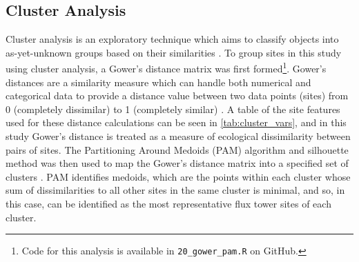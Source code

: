 \subsection{Cluster Analysis} \label{sec:cluster}
Cluster analysis is an exploratory technique which aims to classify objects into as-yet-unknown groups based on their similarities \parencite{landau2010cluster}. To group sites in this study using cluster analysis, a Gower's distance matrix was first formed\footnote{Code for this analysis is available in \texttt{20\_gower\_pam.R} on GitHub.}. Gower's distances are a similarity measure which can handle both numerical and categorical data to provide a distance value between two data points (sites) from 0 (completely dissimilar) to 1 (completely similar) \parencite{gower1971}. A table of the site features used for these distance calculations can be seen in \autoref{tab:cluster_vars}, and in this study Gower's distance is treated as a measure of ecological dissimilarity between pairs of sites. The Partitioning Around Medoids (PAM) algorithm and silhouette method was then used to map the Gower's distance matrix into a specified set of clusters \parencite{rousseeuw1990}. PAM identifies medoids, which are the points within each cluster whose sum of dissimilarities to all other sites in the same cluster is minimal, and so, in this case, can be identified as the most representative flux tower sites of each cluster. 


